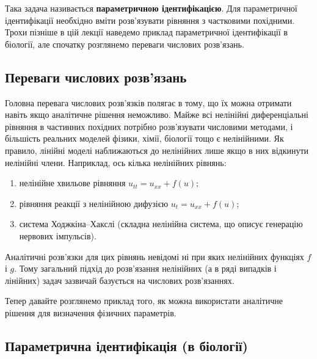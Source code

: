 \documentclass[
  ukrainian,
]{article}
\providecommand{\tightlist}{%
  \setlength{\itemsep}{0pt}\setlength{\parskip}{0pt}}
\begin{document}
Така задача називається \textbf{параметричною ідентифікацією}. Для
параметричної ідентифікації необхідно вміти розв'язувати рівняння з
частковими похідними. Трохи пізніше в цій лекції наведемо приклад
параметричної ідентифікації в біології, але спочатку розглянемо переваги
числових розв'язань.

\subsection{Переваги числових
розв'язань}\label{ux43fux435ux440ux435ux432ux430ux433ux438-ux447ux438ux441ux43bux43eux432ux438ux445-ux440ux43eux437ux432ux44fux437ux430ux43dux44c}

Головна перевага числових розв'язків полягає в тому, що їх можна
отримати навіть якщо аналітичне рішення неможливо. Майже всі нелінійні
диференціальні рівняння в частинних похідних потрібно розв'язувати
числовими методами, і більшість реальних моделей фізики, хімії, біології
тощо є нелінійними. Як правило, лінійні моделі наближаються до
нелінійних лише якщо в них відкинути нелінійні члени. Наприклад, ось
кілька нелінійних рівнянь:

\begin{enumerate}
\def\labelenumi{\arabic{enumi}.}
\tightlist
\item
  нелінійне хвильове рівняння \(u_{tt} = u_{xx} + f(u)\);
\item
  рівняння реакції з нелінійною дифузією \(u_t = u_{xx} + f(u)\);
\item
  система Ходжкіна--Хакслі (складна нелінійна система, що описує
  генерацію нервових імпульсів).
\end{enumerate}

Аналітичні розв'язки для цих рівнянь невідомі ні при яких нелінійних
функціях \(f\) і \(g\). Тому загальний підхід до розв'язання нелінійних
(а в ряді випадків і лінійних) задач зазвичай базується на числових
розв'язаннях.

Тепер давайте розглянемо приклад того, як можна використати аналітичне
рішення для визначення фізичних параметрів.

\subsection{Параметрична ідентифікація (в
біології)}\label{ux43fux430ux440ux430ux43cux435ux442ux440ux438ux447ux43dux430-ux456ux434ux435ux43dux442ux438ux444ux456ux43aux430ux446ux456ux44f-ux432-ux431ux456ux43eux43bux43eux433ux456ux457}
\end{document}
